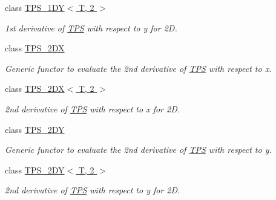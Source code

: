 \begin{CompactItemize}
class \hyperlink{classRBF_1_1TPS__1DY_3_01T_00_012_01_4}{TPS\_\-1DY$<$ T, 2 $>$}
\begin{CompactList}\small\item\em 1st derivative of \hyperlink{classRBF_1_1TPS}{TPS} with respect to y for 2D. \item\end{CompactList}\item 
class \hyperlink{classRBF_1_1TPS__2DX}{TPS\_\-2DX}
\begin{CompactList}\small\item\em Generic functor to evaluate the 2nd derivative of \hyperlink{classRBF_1_1TPS}{TPS} with respect to x. \item\end{CompactList}\item 
class \hyperlink{classRBF_1_1TPS__2DX_3_01T_00_012_01_4}{TPS\_\-2DX$<$ T, 2 $>$}
\begin{CompactList}\small\item\em 2nd derivative of \hyperlink{classRBF_1_1TPS}{TPS} with respect to x for 2D. \item\end{CompactList}\item 
class \hyperlink{classRBF_1_1TPS__2DY}{TPS\_\-2DY}
\begin{CompactList}\small\item\em Generic functor to evaluate the 2nd derivative of \hyperlink{classRBF_1_1TPS}{TPS} with respect to y. \item\end{CompactList}\item 
class \hyperlink{classRBF_1_1TPS__2DY_3_01T_00_012_01_4}{TPS\_\-2DY$<$ T, 2 $>$}
\begin{CompactList}\small\item\em 2nd derivative of \hyperlink{classRBF_1_1TPS}{TPS} with respect to y for 2D. \item\end{CompactList}\end{CompactItemize}
